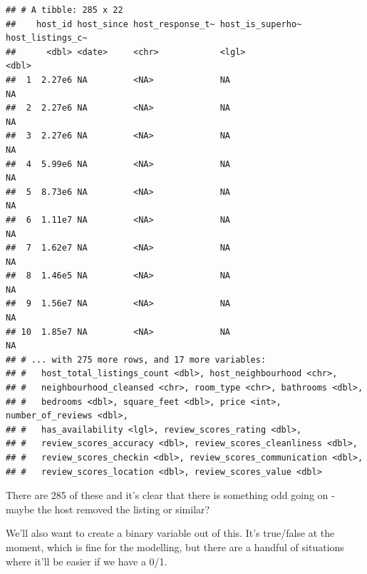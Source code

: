 \documentclass[
]{book}
\newenvironment{Shaded}{\begin{snugshade}}{\end{snugshade}}
\newcommand{\DataTypeTok}[1]{\textcolor[rgb]{0.13,0.29,0.53}{#1}}
\newcommand{\DecValTok}[1]{\textcolor[rgb]{0.00,0.00,0.81}{#1}}
\newcommand{\KeywordTok}[1]{\textcolor[rgb]{0.13,0.29,0.53}{\textbf{#1}}}
\newcommand{\NormalTok}[1]{#1}
\newcommand{\OperatorTok}[1]{\textcolor[rgb]{0.81,0.36,0.00}{\textbf{#1}}}
\newcommand{\OtherTok}[1]{\textcolor[rgb]{0.56,0.35,0.01}{#1}}
\newcommand{\StringTok}[1]{\textcolor[rgb]{0.31,0.60,0.02}{#1}}
\begin{document}
\begin{verbatim}
## # A tibble: 285 x 22
##    host_id host_since host_response_t~ host_is_superho~ host_listings_c~
##      <dbl> <date>     <chr>            <lgl>                       <dbl>
##  1  2.27e6 NA         <NA>             NA                             NA
##  2  2.27e6 NA         <NA>             NA                             NA
##  3  2.27e6 NA         <NA>             NA                             NA
##  4  5.99e6 NA         <NA>             NA                             NA
##  5  8.73e6 NA         <NA>             NA                             NA
##  6  1.11e7 NA         <NA>             NA                             NA
##  7  1.62e7 NA         <NA>             NA                             NA
##  8  1.46e5 NA         <NA>             NA                             NA
##  9  1.56e7 NA         <NA>             NA                             NA
## 10  1.85e7 NA         <NA>             NA                             NA
## # ... with 275 more rows, and 17 more variables:
## #   host_total_listings_count <dbl>, host_neighbourhood <chr>,
## #   neighbourhood_cleansed <chr>, room_type <chr>, bathrooms <dbl>,
## #   bedrooms <dbl>, square_feet <dbl>, price <int>, number_of_reviews <dbl>,
## #   has_availability <lgl>, review_scores_rating <dbl>,
## #   review_scores_accuracy <dbl>, review_scores_cleanliness <dbl>,
## #   review_scores_checkin <dbl>, review_scores_communication <dbl>,
## #   review_scores_location <dbl>, review_scores_value <dbl>
\end{verbatim}

There are 285 of these and it's clear that there is something odd going on - maybe the host removed the listing or similar?

We'll also want to create a binary variable out of this. It's true/false at the moment, which is fine for the modelling, but there are a handful of situations where it'll be easier if we have a 0/1.

\begin{Shaded}
\end{Shaded}
\end{document}
